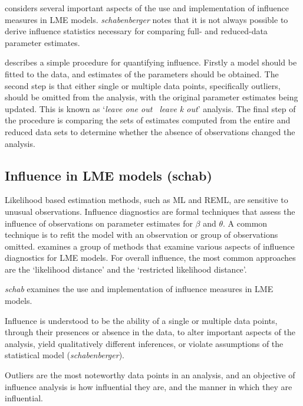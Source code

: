 \documentclass[Main.tex]{subfiles}
\begin{document}
				
				
				\citet{schab} considers several important aspects of the use and implementation of influence measures in LME models. \textit{schabenberger} notes that it is not always possible to
				derive influence statistics necessary for comparing full- and reduced-data parameter estimates. 
				
				\citet{schab} describes a simple procedure for quantifying influence. Firstly a model should be fitted to the data, and
				estimates of the parameters should be obtained. The second step is that either single or multiple data points, specifically outliers,
				should be omitted from the analysis, with the original parameter estimates being updated. This is known as `\textit{leave one out \ leave k out}' analysis. The final step of the procedure is comparing the 	sets of estimates computed from the entire and reduced data sets to determine whether the absence of observations changed the
				analysis.		

		
		\subsection{Influence in LME models (schab)}
		Likelihood based estimation methods, such as ML and REML, are sensitive to unusual observations. Influence diagnostics are formal techniques that assess the influence of observations on parameter estimates for $\beta$ and $\theta$. A common technique is to refit the model with an observation or group of observations omitted.\citet{west} examines a group of methods that examine various aspects of influence diagnostics for LME models.
		For overall influence, the most common approaches are the `likelihood distance' and the `restricted likelihood distance'.
		
		\emph{schab} examines the use and implementation of influence measures in LME models.
		
		Influence is understood to be the ability of a single or multiple
		data points, through their presences or absence in the data, to
		alter important aspects of the analysis, yield qualitatively
		different inferences, or violate assumptions of the statistical
		model (\textit{schabenberger}).
		
		Outliers are the most noteworthy data points in an analysis, and
		an objective of influence analysis is how influential they are,
		and the manner in which they are influential.
		
\end{document}
